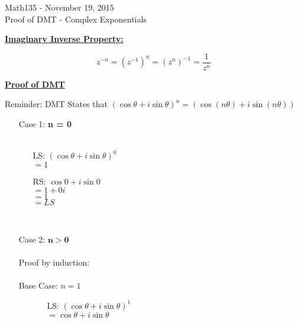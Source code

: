 \documentclass{letter}
\begin{document}
	\begin{center}
		\LARGE Math135 - November 19, 2015\\
		\large Proof of DMT - Complex Exponentials
	\end{center}
	\vspace{0.25 in}
	\underline{\textbf{Imaginary Inverse Property:}}
	
	\[ z^{-n} = (z^{-1})^n = (z^n)^{-1} = \dfrac{1}{z^n} \]
	
	\underline{\textbf{Proof of DMT}}
	
	Reminder: DMT States that $(\cos \theta + i \sin \theta)^n =
	 (\cos (n \theta) + i \sin (n \theta))$
	\begin{itemize}
		\item[Case 1: ]\textbf{n = 0}\\\\
		\begin{minipage}[t]{0.5\textwidth}
			\begin{itemize}
				\item[LS: ] $(\cos \theta + i \sin \theta)^0$\\
				$=1$
			\end{itemize}
		\end{minipage}
		\begin{minipage}[t]{0.5\textwidth}
			\begin{itemize}
				\item[RS: ] $\cos 0 + i \sin 0$\\
				$= 1 + 0i$\\
				$= 1$\\
				$= LS$
			\end{itemize}
		\end{minipage}
		\\
		\item[Case 2: ] $\mathbf{n > 0}$\\\\
		Proof by induction:\\\\
		Base Case: $n = 1$\\
		\begin{itemize}
			\item[\;\;\;]
			\begin{minipage}[t]{0.5\textwidth}
				\begin{itemize}
					\item[LS: ] $(\cos \theta + i \sin \theta)^1$\\
					$= \cos \theta + i \sin \theta$
				\end{itemize}

\end{minipage}
\end{itemize}
\end{itemize}
\end{document}
